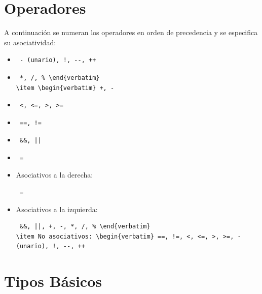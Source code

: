 \documentclass[11pt, spanish]{report}
\begin{document}
\section{Operadores}
A continuaci\'on se numeran los operadores en orden de precedencia y se especifica su asociatividad:

\begin{itemize}
\item \begin{verbatim} - (unario), !, --, ++ \end{verbatim}
\item \begin{verbatim} *, /, % \end{verbatim}
\item \begin{verbatim} +, - \end{verbatim}
\item \begin{verbatim} <, <=, >, >= \end{verbatim}
\item \begin{verbatim} ==, != \end{verbatim}
\item \begin{verbatim} &&, || \end{verbatim}
\item \begin{verbatim} = \end{verbatim}
\end{itemize}

\begin{itemize}
\item Asociativos a la derecha: \begin{verbatim} = \end{verbatim}
\item Asociativos a la izquierda: \begin{verbatim} &&, ||, +, -, *, /, % \end{verbatim}
\item No asociativos: \begin{verbatim} ==, !=, <, <=, >, >=, - (unario), !, --, ++ \end{verbatim}
\end{itemize}

\section{Tipos B\'asicos}
\end{document}
